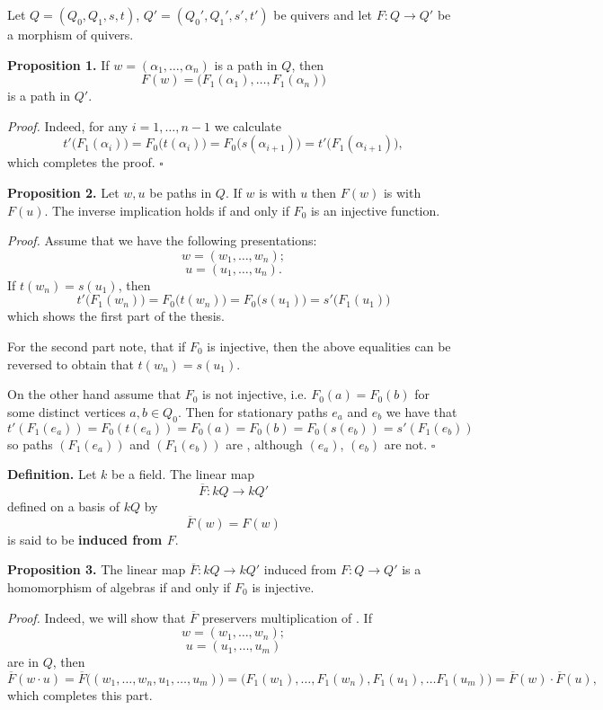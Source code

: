 \documentclass[12pt]{article}
\begin{document}
Let $Q=(Q_0,Q_1,s,t)$, $Q'=(Q_0',Q_1',s',t')$ be quivers and let $F:Q\to Q'$ be a morphism of quivers.

\textbf{Proposition 1.} If $w=(\alpha_1,\ldots,\alpha_n)$ is a path in $Q$, then $$F(w)=\big(F_1(\alpha_1),\ldots,F_1(\alpha_n)\big)$$ is a path in $Q'$.

\textit{Proof.} Indeed, for any $i=1,\ldots,n-1$ we calculate
$$t'\big(F_1(\alpha_i)\big)=F_0\big(t(\alpha_i)\big)=F_0\big(s(\alpha_{i+1})\big)=t'\big(F_1(\alpha_{i+1})\big),$$
which completes the proof. $\square$

\textbf{Proposition 2.} Let $w,u$ be paths in $Q$. If $w$ is  with $u$ then $F(w)$ is  with $F(u)$. The inverse implication holds if and only if $F_0$ is an injective function.

\textit{Proof.} Assume that we have the following presentations:
$$w=(w_1,\ldots,w_n);$$
$$u=(u_1,\ldots,u_n).$$
If $t(w_n)=s(u_1)$, then
$$t'\big(F_1(w_n)\big)=F_0\big(t(w_n)\big)=F_0\big(s(u_1)\big)=s'\big(F_1(u_1))$$
which shows the first part of the thesis.

For the second part note, that if $F_0$ is injective, then the above equalities can be reversed to obtain that $t(w_n)=s(u_1)$.

On the other hand assume that $F_0$ is not injective, i.e. $F_0(a)=F_0(b)$ for some distinct vertices $a,b\in Q_0$. Then for stationary paths $e_a$ and $e_b$ we have that 
$$t'(F_1(e_a))=F_0(t(e_a))=F_0(a)=F_0(b)=F_0(s(e_b))=s'(F_1(e_b))$$
so paths $(F_1(e_a))$ and $(F_1(e_b))$ are , although $(e_a)$, $(e_b)$ are not. $\square$

\textbf{Definition.} Let $k$ be a field. The linear map $$\overline{F}:kQ\to kQ'$$ defined on a basis of $kQ$ by
$$\overline{F}(w)=F(w)$$
is said to be \textbf{induced from $F$}.

\textbf{Proposition 3.} The linear map $\overline{F}:kQ\to kQ'$ induced from $F:Q\to Q'$ is a homomorphism of algebras if and only if $F_0$ is injective.

\textit{Proof.} Indeed, we will show that $\overline{F}$ preservers multiplication of . If
$$w=(w_1,\ldots,w_n);$$
$$u=(u_1,\ldots,u_m)$$
are  in $Q$, then
$$\overline{F}(w\cdot u)=\overline{F}\big((w_1,\ldots,w_n,u_1,\ldots,u_m)\big)=\big(F_1(w_1),\ldots,F_1(w_n),F_1(u_1),\ldots F_1(u_m)\big)=\overline{F}(w)\cdot\overline{F}(u),$$
which completes this part.
\end{document}

